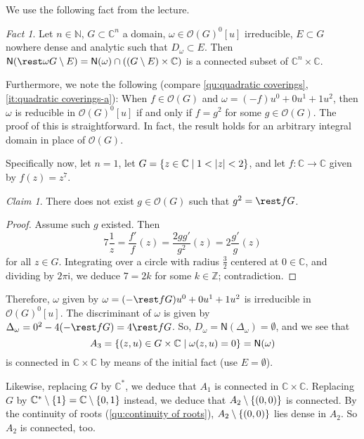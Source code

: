 \documentclass[a4paper]{amsart}
\newcommand{\N}{\mathbb{N}}
\newcommand{\Z}{\mathbb{Z}}
\newcommand{\C}{\mathbb{C}}
\newcommand{\Zero}[1]{\mathsf{N}(#1)}
\newcommand{\ii}{\mathsf{i}}
\renewcommand{\O}{\mathcal{O}}
\theoremstyle{remark}
\newtheorem{claim}{Claim}[question]
\newtheorem{fact}{Fact}[question]
\numberwithin{equation}{question}
\DeclarePairedDelimiter\abs{\lvert}{\rvert}
\DeclarePairedDelimiter\set{\{}{\}}
\begin{document}
\begin{solution}%
\begin{solenum}
\item We use the following fact from the lecture.
\begin{fact}
Let $n \in \N$, $G \subset \C^n$ a domain, $\omega \in \O(G)^0[u]$ irreducible, $E \subset G$ nowhere dense and analytic such that $D_\omega \subset E$. Then $\Zero{\rest\omega{G \setminus E}} = \Zero\omega \cap ((G \setminus E) \times \C)$ is a connected subset of $\C^n \times \C$.
\end{fact}

Furthermore, we note the following (compare \cref{qu:quadratic coverings}, \cref{it:quadratic coverings-a}): When $f \in \O(G)$ and $\omega = (-f)u^0 + 0u^1 + 1u^2$, then $\omega$ is reducible in $\O(G)^0[u]$ if and only if $f = g^2$ for some $g \in \O(G)$. The proof of this is straightforward. In fact, the result holds for an arbitrary integral domain in place of $\O(G)$.

Specifically now, let $n = 1$, let $G = \set{z \in \C \mid 1 < \abs z < 2}$, and let $f \colon \C \to \C$ given by $f(z) = z^7$.
\begin{claim}
There does not exist $g \in \O(G)$ such that $g^2 = \rest fG$.
\end{claim}
\begin{proof}
Assume such $g$ existed. Then
\[
7\frac1z = \frac{f'}f(z) = \frac{2gg'}{g^2}(z) = 2\frac{g'}g(z)
\]
for all $z \in G$. Integrating over a circle with radius $\frac32$ centered at $0 \in \C$, and dividing by $2\pi\ii$, we deduce $7 = 2k$ for some $k \in \Z$; contradiction.
\end{proof}

Therefore, $\omega$ given by $\omega = (-\rest fG)u^0 + 0u^1 + 1u^2$ is irreducible in $\O(G)^0[u]$. The discriminant of $\omega$ is given by $\Delta_\omega = 0^2 - 4(-\rest fG) = 4\rest fG$. So, $D_\omega = \Zero{\Delta_\omega} = \emptyset$, and we see that
\[
A_3 = \set{(z,u) \in G \times \C \mid \omega(z,u) = 0} = \Zero\omega
\]
is connected in $\C \times \C$ by means of the initial fact (use $E = \emptyset$).

Likewise, replacing $G$ by $\C^*$, we deduce that $A_1$ is connected in $\C \times \C$. Replacing $G$ by $\C^* \setminus \set1 = \C \setminus \set{0,1}$ instead, we deduce that $A_2 \setminus \set{(0,0)}$ is connected. By the continuity of roots (\cref{qu:continuity of roots}), $A_2 \setminus \set{(0,0)}$ lies dense in $A_2$. So $A_2$ is connected, too.


\end{solenum}
\end{solution}
\end{document}
